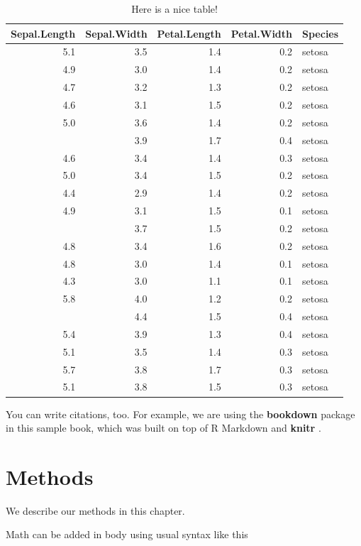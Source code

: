 \documentclass[
]{book}
\begin{document}
\begin{table}

\caption{\label{tab:nice-tab}Here is a nice table!}
\centering
\begin{tabular}[t]{rrrrl}
\toprule
Sepal.Length & Sepal.Width & Petal.Length & Petal.Width & Species\\
\midrule
5.1 & 3.5 & 1.4 & 0.2 & setosa\\
4.9 & 3.0 & 1.4 & 0.2 & setosa\\
4.7 & 3.2 & 1.3 & 0.2 & setosa\\
4.6 & 3.1 & 1.5 & 0.2 & setosa\\
5.0 & 3.6 & 1.4 & 0.2 & setosa\\
\addlinespace
5.4 & 3.9 & 1.7 & 0.4 & setosa\\
4.6 & 3.4 & 1.4 & 0.3 & setosa\\
5.0 & 3.4 & 1.5 & 0.2 & setosa\\
4.4 & 2.9 & 1.4 & 0.2 & setosa\\
4.9 & 3.1 & 1.5 & 0.1 & setosa\\
\addlinespace
5.4 & 3.7 & 1.5 & 0.2 & setosa\\
4.8 & 3.4 & 1.6 & 0.2 & setosa\\
4.8 & 3.0 & 1.4 & 0.1 & setosa\\
4.3 & 3.0 & 1.1 & 0.1 & setosa\\
5.8 & 4.0 & 1.2 & 0.2 & setosa\\
\addlinespace
5.7 & 4.4 & 1.5 & 0.4 & setosa\\
5.4 & 3.9 & 1.3 & 0.4 & setosa\\
5.1 & 3.5 & 1.4 & 0.3 & setosa\\
5.7 & 3.8 & 1.7 & 0.3 & setosa\\
5.1 & 3.8 & 1.5 & 0.3 & setosa\\
\bottomrule
\end{tabular}
\end{table}

You can write citations, too. For example, we are using the \textbf{bookdown} package \citep{R-bookdown} in this sample book, which was built on top of R Markdown and \textbf{knitr} \citep{xie2015}.

\hypertarget{methods}{%
\chapter{Methods}\label{methods}}

We describe our methods in this chapter.

Math can be added in body using usual syntax like this
\end{document}
